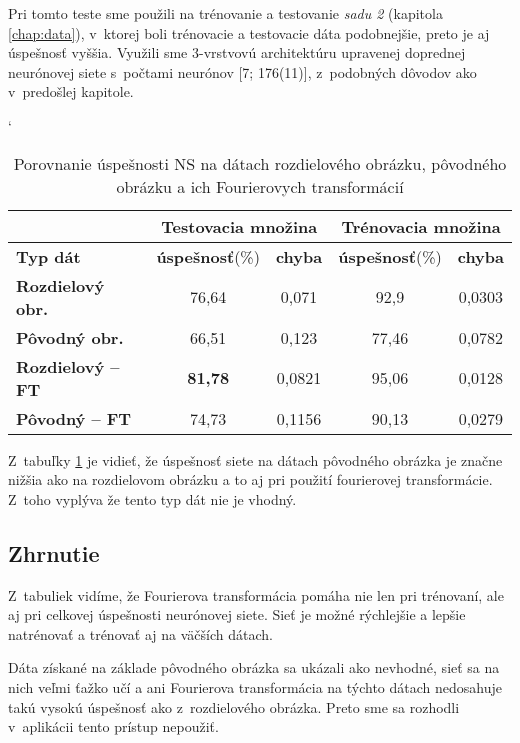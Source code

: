 Pri tomto teste sme použili na trénovanie a testovanie \textit{sadu 2} (kapitola \ref{chap:data}), v~ktorej boli trénovacie a testovacie dáta podobnejšie, preto je aj úspešnosť vyššia. Využili sme 3-vrstvovú architektúru upravenej doprednej neurónovej siete s~počtami neurónov [7; 176(11)], z~podobných dôvodov ako v~predošlej kapitole.

\begin{table}[h]
\catcode` %
\centering
\begin{tabular}{|l|c|c|c|c|}
\cline{2-5}
\multicolumn{1}{l}{} & \multicolumn{2}{|c|}{\textbf{Testovacia množina}} & \multicolumn{2}{c|}{\textbf{Trénovacia množina}}\\ 
\hline
\textbf{Typ dát} & \textbf{úspešnosť}(\%) & \textbf{chyba} & \textbf{úspešnosť}(\%) & \textbf{chyba}\\ \hline
\textbf{Rozdielový obr.} & 76,64 & 0,071 & 92,9 & 0,0303 \\ \hline
\textbf{Pôvodný obr.} & 66,51 & 0,123 & 77,46 & 0,0782 \\ \hline
\textbf{Rozdielový -- FT} & \textbf{81,78} & 0,0821 & 95,06 & 0,0128\\ \hline
\textbf{Pôvodný -- FT} & 74,73 & 0,1156 & 90,13 & 0,0279\\ \hline
\end{tabular}
\caption{Porovnanie úspešnosti NS na dátach rozdielového obrázku, pôvodného obrázku a ich Fourierovych transformácií}
\label{tab:neuraldatacmp}
\end{table}

Z~tabuľky \ref{tab:neuraldatacmp} je vidieť, že úspešnosť siete na dátach pôvodného obrázka je značne nižšia ako na rozdielovom obrázku a to aj pri použití fourierovej transformácie. Z~toho vyplýva že tento typ dát nie je vhodný.

\subsection{Zhrnutie}

Z~tabuliek vidíme, že Fourierova transformácia pomáha nie len pri trénovaní, ale aj pri celkovej úspešnosti neurónovej siete. Sieť je možné rýchlejšie a lepšie natrénovať a trénovať aj na väčších dátach.

Dáta získané na základe pôvodného obrázka sa ukázali ako nevhodné, sieť sa na nich veľmi ťažko učí a ani Fourierova transformácia na týchto dátach nedosahuje takú vysokú úspešnosť ako z~rozdielového obrázka. Preto sme sa rozhodli v~aplikácii tento prístup nepoužiť.
